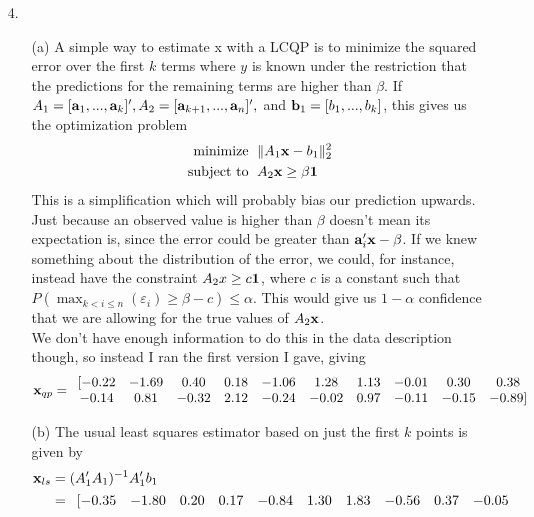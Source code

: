 \documentclass[11pt]{article}
\theoremstyle{definition}
\begin{document}
\begin{itemize}
    \item[4.]
        \begin{itemize}
            \item[(a)]
                A simple way to estimate x with a LCQP is to minimize the squared error over the first $k$ terms where $y$ is known under the restriction that the predictions for the remaining terms are higher than $\beta$. If \(A_1=[{\bf a}_1,...,{\bf a}_k]', A_2=[{\bf a}_{k+1},...,{\bf a}_n]',\) and \({\bf b}_1=[b_1,...,b_k]\), this gives us the optimization problem
                \begin{align*}
                    \text{minimize    }\; & \|A_1{\bf x}-b_1\|_2^2 \\
                    \text{subject to  }\; & A_2{\bf x}\geq \beta{\bf 1} \\
                \end{align*}
                This is a simplification which will probably bias our prediction upwards. Just because an observed value is higher than $\beta$ doesn't mean its expectation is, since the error could be greater than \({\bf a}_i'{\bf x}-\beta\). If we knew something about the distribution of the error, we could, for instance, instead have the constraint \(A_2x\geq c{\bf 1}\), where $c$ is a constant such that \(P(\max_{k<i\leq n}(\varepsilon_i)\geq \beta-c)\leq \alpha\). This would give us $1-\alpha$ confidence that we are allowing for the true values of \(A_2{\bf x}\). 
                \smallskip  \\         
                We don't have enough information to do this in the data description though, so instead I ran the first version I gave, giving
                \[{\bf x}_{qp}=
                    \begin{array}{cccccccccc} 
                       [-0.22 & -1.69 &  0.40 &  0.18 & -1.06 &  1.28 & 1.13 & -0.01 &  0.30 &  0.38 \\
                        -0.14 &  0.81 & -0.32 &  2.12 & -0.24 & -0.02 & 0.97 & -0.11 & -0.15 & -0.89]
                    \end{array} \]
            \item[(b)]
                The usual least squares estimator based on just the first $k$ points is given by
                \begin{align*}
                    {\bf x}_{ls} &= (A_1'A_1)^{-1}A_1' b_1 \\
                                 &= \begin{array}{cccccccccc} 
                                        [-0.35& -1.80&  0.20& 0.17& -0.84&  1.30& 1.83& -0.56&  0.37& -0.05 \\

\end{array}
\end{align*}
\end{itemize}
\end{itemize}
\end{document}
